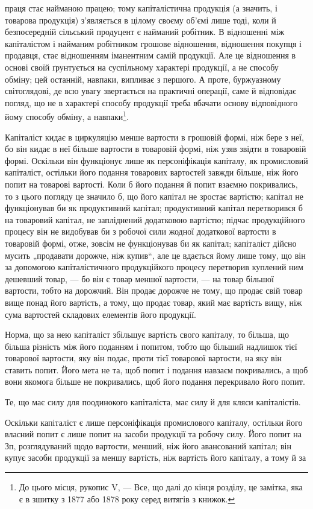 праця стає найманою працею; тому капіталістична продукція (а значить,
і товарова продукція) з’являється в цілому своєму об’ємі лише тоді,
коли й безпосередній сільський продуцент є найманий робітник. В відношенні
між капіталістом і найманим робітником грошове відношення, відношення покупця і продавця, стає
відношенням іманентним самій продукції. Але це відношення в основі своїй ґрунтується на суспільному
характері продукції, а не способу обміну; цей останній, навпаки, випливає з першого.
А проте, буржуазному світоглядові, де всю увагу звертається на практичні
операції, саме й відповідає погляд, що не в характері способу продукції
треба вбачати основу відповідного йому способу обміну, а навпаки\footnote{
До цього місця, рукопис V, — Все, що далі до кінця розділу, це замітка, яка є в зшитку з 1877 або
1878 року серед витягів з книжок.
}.

Капіталіст кидає в циркуляцію менше вартости в грошовій формі,
ніж бере з неї, бо він кидає в неї більше вартости в товаровій формі,
ніж узяв звідти в товаровій формі. Оскільки він функціонує лише як персоніфікація
капіталу, як промисловий капіталіст, остільки його подання
товарових вартостей завжди більше, ніж його попит на товарові вартості.
Коли б його подання й попит взаємно покривались, то з цього погляду
це значило б, що його капітал не зростає вартістю; капітал не функціонував
би як продуктивний капітал; продуктивний капітал перетворився б
на товаровий капітал, не запліднений додатковою вартістю; підчас продукційного
процесу він не видобував би з робочої сили жодної додаткової
вартости в товаровій формі, отже, зовсім не функціонував би як
капітал; капіталіст дійсно мусить „продавати дорожче, ніж купив“, але
це вдається йому лише тому, що він за допомогою капіталістичного
продукційкого процесу перетворив куплений ним дешевший товар, — бо він
є товар меншої вартости, — на товар більшої вартости, тобто на дорожчий.
Він продає дорожче не тому, що продає свій товар вище понад його
вартість, а тому, що продає товар, який має вартість вищу, ніж сума
вартостей складових елементів його продукції.

Норма, що за нею капіталіст збільшує вартість свого капіталу, то більша,
що більша різність між його поданням і попитом, тобто що більший
надлишок тієї товарової вартости, яку він подає, проти тієї товарової
вартости, на яку він ставить попит. Його мета не та, щоб попит і
подання навзаєм покривались, а щоб вони якомога більше не покривались,
щоб його подання перекривало його попит.

Те, що має силу для поодинокого капіталіста, має силу й для кляси
капіталістів.

Оскільки капіталіст є лише персоніфікація промислового капіталу,
остільки його власний попит є лише попит на засоби продукції та
робочу силу. Його попит на Зп, розглядуваний щодо вартости,
менший, ніж його авансований капітал; він купує засоби продукції
за меншу вартість, ніж вартість його капіталу, а тому й за